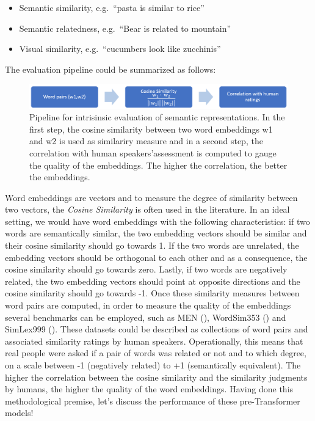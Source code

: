\documentclass[
]{krantz}
\begin{document}
\begin{itemize}
\item
  Semantic similarity, e.g.~``pasta is similar to rice''
\item
  Semantic relatedness, e.g.~``Bear is related to mountain''
\item
  Visual similarity, e.g.~``cucumbers look like zucchinis''
\end{itemize}

The evaluation pipeline could be summarized as follows:

\begin{figure}

{\centering \includegraphics[width=1\linewidth]{figures/02-03-img-support-text/img-eval01} 

}

\caption{Pipeline for intrisinsic evaluation of semantic representations. In the first step, the cosine similarity between two word embeddings w1 and w2 is used as similariry measure and in a second step, the correlation with human speakers'assessment is computed to gauge the quality of the embeddings. The higher the correlation, the better the embeddings.}\label{fig:img-eval01}
\end{figure}

Word embeddings are vectors and to measure the degree of similarity between two vectors, the \emph{Cosine Similarity} is often used in the literature. In an ideal setting, we would have word embeddings with the following characteristics: if two words are semantically similar, the two embedding vectors should be similar and their cosine similarity should go towards 1. If the two words are unrelated, the embedding vectors should be orthogonal to each other and as a consequence, the cosine similarity should go towards zero. Lastly, if two words are negatively related, the two embedding vectors should point at opposite directions and the cosine similarity should go towards -1.
Once these similarity measures between word pairs are computed, in order to measure the quality of the embeddings several benchmarks can be employed, such as MEN (\citet{bruni2014multimodal}), WordSim353 (\citet{agirre2009study}) and SimLex999 (\citet{hill2015simlex}). These datasets could be described as collections of word pairs and associated similarity ratings by human speakers. Operationally, this means that real people were asked if a pair of words was related or not and to which degree, on a scale between -1 (negatively related) to +1 (semantically equivalent). The higher the correlation between the cosine similarity and the similarity judgments by humans, the higher the quality of the word embeddings. Having done this methodological premise, let's discuss the performance of these pre-Transformer models!
\end{document}
